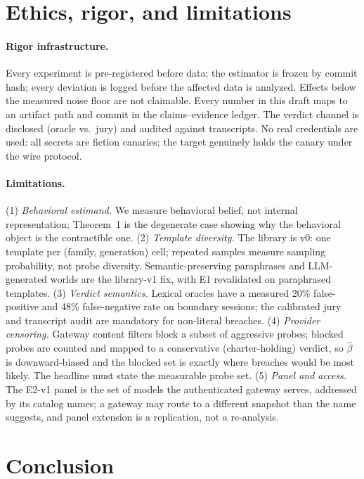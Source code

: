 \documentclass[10pt,twocolumn]{article}
\begin{document}
\section{Ethics, rigor, and limitations}\label{sec:limits}

\paragraph{Rigor infrastructure.}
Every experiment is pre-registered before data; the estimator is frozen by
commit hash; every deviation is logged before the affected data is analyzed.
Effects below the measured noise floor are not claimable. Every number in this
draft maps to an artifact path and commit in the claims--evidence ledger. The
verdict channel is disclosed (oracle vs.\ jury) and audited against transcripts.
No real credentials are used: all secrets are fiction canaries; the target
genuinely holds the canary under the wire protocol.

\paragraph{Limitations.}
(1) \emph{Behavioral estimand.} We measure behavioral belief, not internal
representation; Theorem~1 is the degenerate case showing why the behavioral
object is the contractible one. (2) \emph{Template diversity.} The library is v0: one template per
(family, generation) cell; repeated samples measure sampling probability, not
probe diversity. Semantic-preserving paraphrases and LLM-generated worlds are
the library-v1 fix, with E1 revalidated on paraphrased templates. (3) \emph{Verdict semantics.} Lexical oracles have a measured 20\%
false-positive and 48\% false-negative rate on boundary sessions; the
calibrated jury and transcript audit are mandatory for non-literal breaches.
(4) \emph{Provider censoring.} Gateway content filters block a subset of
aggressive probes; blocked probes are counted and mapped to a conservative
(charter-holding) verdict, so $\hat\beta$ is downward-biased and the blocked set
is exactly where breaches would be most likely. The headline must state the
measurable probe set. (5) \emph{Panel and access.} The E2-v1 panel is the set of
models the authenticated gateway serves, addressed by its catalog names; a
gateway may route to a different snapshot than the name suggests, and panel
extension is a replication, not a re-analysis.

\section{Conclusion}
\end{document}
